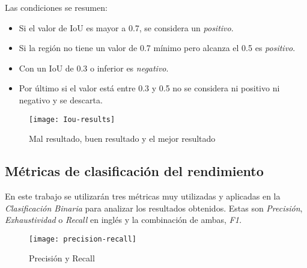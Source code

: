 Las condiciones se resumen:

\begin{itemize}
    \item Si el valor de IoU es mayor a 0.7, se considera un \emph{positivo}.
    \item Si la región no tiene un valor de 0.7 mínimo pero alcanza el 0.5 es \emph{positivo}.
    \item Con un IoU de 0.3 o inferior es \emph{negativo}.
    \item Por último si el valor está entre 0.3 y 0.5 no se considera ni positivo ni negativo y se descarta.
\end{itemize}

\begin{figure}[htb]
	\centering
	\texttt{[image: Iou-results]}
	\caption[Mal resultado, buen resultado y el mejor resultado]{Mal resultado, buen resultado y el mejor resultado
	\cite{metrics:iou-results}}
\end{figure}

\subsection{Métricas de clasificación del rendimiento}
En este trabajo se utilizarán tres métricas muy utilizadas y aplicadas en la \emph{Clasificación Binaria} para analizar los resultados obtenidos. Estas son \emph{Precisión}, \emph{Exhaustividad} o \emph{Recall} en inglés y la combinación de ambas, \emph{F1.}\cite{metrics:guia-google}

\begin{figure}[htb]
	\centering
	\texttt{[image: precision-recall]}
	\caption[Precisión y Recall]{Precisión y Recall
	\cite{metrics:precision-recall}}
\end{figure}


